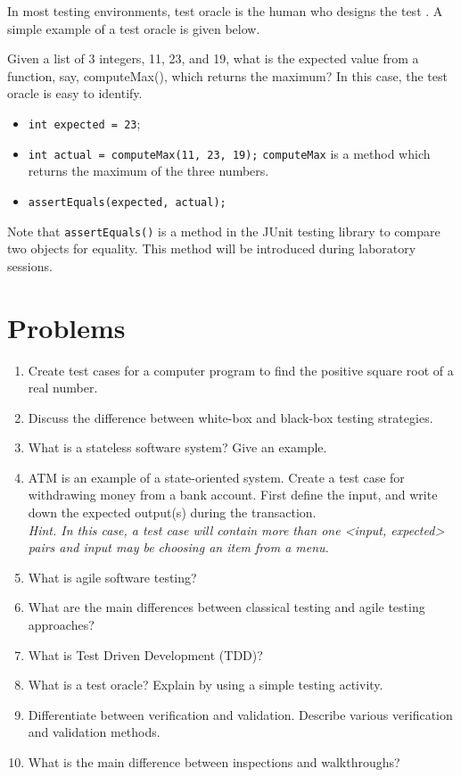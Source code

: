 In most testing environments, test oracle is the human who designs the test \autocite{bertolino1996use}. A simple example of a test oracle is given below. 

Given a list of 3 integers, 11, 23, and 19, what is the expected value from a function, say, computeMax(), which returns the maximum? In this case, the test oracle is easy to identify.

\begin{itemize}
    \item \lstinline!int expected = 23!; 
    \item \lstinline!int actual = computeMax(11, 23, 19);! \lstinline!computeMax! is a method which returns the maximum of the three numbers.
    \item \lstinline!assertEquals(expected, actual);!
\end{itemize}

Note that \lstinline!assertEquals()! is a method in the JUnit testing library to compare two objects for equality. This method will be introduced during laboratory sessions.

\section{Problems}
\begin{enumerate}
    \item Create test cases for a computer program to find the positive square root of a real number.
    \item Discuss the difference between white-box and black-box testing strategies.
    \item What is a stateless software system? Give an example.
    \item ATM is an example of a state-oriented system. Create a test case for withdrawing money from a bank account. First define the input, and write down the expected output(s) during the transaction.\\
    \emph{Hint. In this case, a test case will contain more than one <input, expected> pairs and input may be choosing an item from a menu.}
    \item What is agile software testing? 
    \item What are the main differences between classical testing and agile testing approaches?
    \item What is Test Driven Development (TDD)?
    \item What is a test oracle? Explain by using a simple testing activity.
    \item Differentiate between verification and validation. Describe various verification and validation methods.
    \item What is the main difference between inspections and walkthroughs?
\end{enumerate}